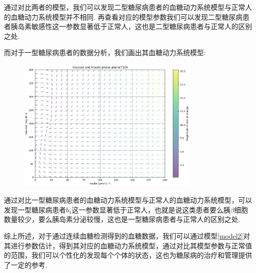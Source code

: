 通过对比两者的模型，我们可以发现二型糖尿病患者的血糖动力系统模型与正常人的血糖动力系统模型并不相同. 再查看对应的模型参数我们可以发现二型糖尿病患者胰岛素敏感性这一参数显著低于正常人，这也是二型糖尿病患者与正常人的区别之处. 

而对于一型糖尿病患者的数据分析，我们画出其血糖动力系统模型:
\begin{figure}[H]
    \centering
    \includegraphics[width=0.8\textwidth]{Img/t1dphase.png}
    \label{fig:1type}
\end{figure}

通过对比一型糖尿病患者的血糖动力系统模型与正常人的血糖动力系统模型，可以发现一型糖尿病患者$b_1$这一参数显著低于正常人，也就是说这类患者要么胰$\beta$细胞数量较少，要么胰岛素分泌较慢，这也是一型糖尿病患者与正常人的区别之处. 

综上所述，对于通过连续血糖检测得到的血糖数据，我们可以通过模型\ref{model2}对其进行参数估计，得到其对应的血糖动力系统模型，通过对比其模型参数与正常值的范围，我们可以个性化的发现每个个体的状态，这也为糖尿病的治疗和管理提供了一定的参考. 

